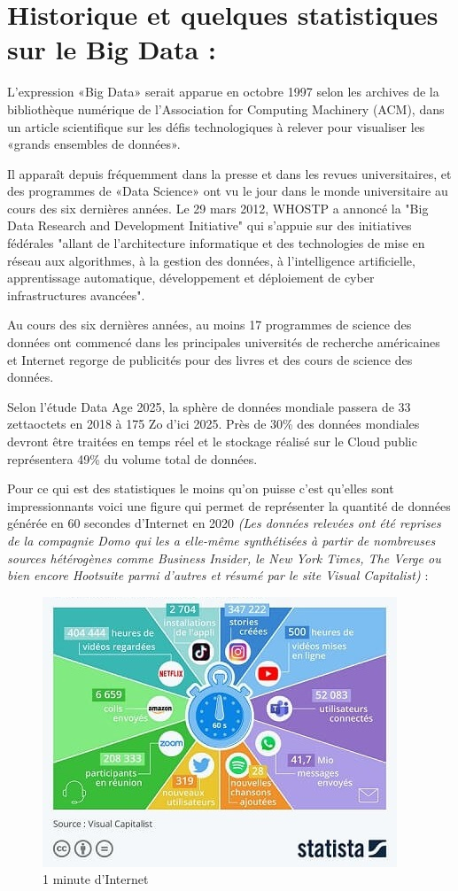 \section{Historique et quelques statistiques sur le Big Data : }
L'expression «Big Data» serait apparue en octobre 1997 selon les archives de la bibliothèque numérique de l'Association for Computing Machinery (ACM), dans un article scientifique sur les défis technologiques à relever pour visualiser les «grands ensembles de données».

Il apparaît depuis fréquemment dans la presse et dans les revues universitaires, et des programmes de «Data Science» ont vu le jour dans le monde universitaire au cours des six dernières années. Le 29 mars 2012, WHOSTP a annoncé la "Big Data Research and Development Initiative" qui s'appuie sur des initiatives fédérales "allant de l'architecture informatique et des technologies de mise en réseau aux algorithmes, à la gestion des données, à l'intelligence artificielle, apprentissage automatique, développement et déploiement de cyber infrastructures avancées".

Au cours des six dernières années, au moins 17 programmes de science des données ont commencé dans les principales universités de recherche américaines et Internet regorge de publicités pour des livres et des cours de science des données. 

Selon l'étude Data Age 2025, la sphère de données mondiale passera de 33 zettaoctets en 2018 à 175 Zo d'ici 2025. Près de 30\% des données mondiales devront être traitées en temps réel et le stockage réalisé sur le Cloud public représentera 49\% du volume total de données.

Pour ce qui est des statistiques le moins qu'on puisse c'est qu'elles sont impressionnants voici une figure qui permet de représenter la quantité de données générée en 60 secondes d'Internet en 2020 
\textit{(Les données relevées ont été reprises de la compagnie Domo qui les a elle-même synthétisées à partir de nombreuses sources hétérogènes comme Business Insider, le New York Times, The Verge ou bien encore Hootsuite parmi d'autres et résumé par le site Visual Capitalist)} :

\begin{figure}[h]
	\centering
    \includegraphics[scale=0.8]{img/fig1}
    \caption{1 minute d'Internet}
\end{figure}

